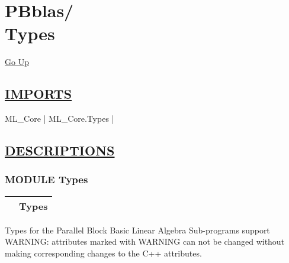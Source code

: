 \chapter*{\color{headfile}
{\large PBblas\slash\hspace{0pt}}
 \\
Types
}
\hypertarget{ecldoc:toc:PBblas.Types}{}
\hyperlink{ecldoc:toc:root/PBblas}{Go Up}

\section*{\underline{\textsf{IMPORTS}}}
\begin{doublespace}
{\large
ML\_Core |
ML\_Core.Types |
}
\end{doublespace}

\section*{\underline{\textsf{DESCRIPTIONS}}}
\subsection*{\textsf{\colorbox{headtoc}{\color{white} MODULE}
Types}}

\hypertarget{ecldoc:PBblas.Types}{}

{\renewcommand{\arraystretch}{1.5}
\begin{tabularx}{\textwidth}{|>{\raggedright\arraybackslash}l|X|}
\hline
\hspace{0pt}\mytexttt{\color{red} } & \textbf{Types} \\
\hline
\end{tabularx}
}

\par
Types for the Parallel Block Basic Linear Algebra Sub-programs support WARNING: attributes marked with WARNING can not be changed without making corresponding changes to the C++ attributes.


